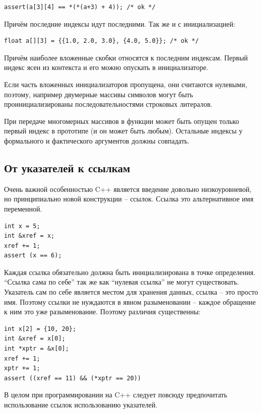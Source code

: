 \documentclass[a4paper,12pt,oneside]{article}
\begin{document}
\begin{lstlisting}
assert(a[3][4] == *(*(a+3) + 4)); /* ok */
\end{lstlisting}

Причём последние индексы идут последними. Так же и с инициализацией:

\begin{lstlisting}
float a[][3] = {{1.0, 2.0, 3.0}, {4.0, 5.0}}; /* ok */
\end{lstlisting}

Причём наиболее вложенные скобки относятся к последним индексам. Первый индекс ясен из контекста и его можно опускать в инициализаторе.

Если часть вложенных инициализаторов пропущена, они считаются нулевыми, поэтому, например двумерные массивы символов могут быть проинициализированы последовательностями строковых литералов.

При передаче многомерных массивов в функции может быть опущен только первый индекс в прототипе (и он может быть любым). Остальные индексы у формального и фактического аргументов должны совпадать.

\subsection{От указателей к ссылкам}

Очень важной особенностью C++ является введение довольно низкоуровневой, но принципиально новой конструкции – ссылок. Ссылка это альтернативное имя переменной.

\begin{lstlisting}
int x = 5;
int &xref = x;
xref += 1;
assert (x == 6);
\end{lstlisting}

Каждая ссылка обязательно должна быть инициализирована в точке определения. ``Ссылка сама по себе'' так же как ``нулевая ссылка'' не могут существовать. Указатель сам по себе является местом для хранения данных, ссылка – это просто имя. Поэтому ссылки не нуждаются в явном разыменовании – каждое обращение к ним это уже разыменование. Поэтому различия существенны:

\begin{lstlisting}
int x[2] = {10, 20};
int &xref = x[0];
int *xptr = &x[0];
xref += 1;
xptr += 1;
assert ((xref == 11) && (*xptr == 20))
\end{lstlisting}

В целом при программировании на C++ следует повсюду предпочитать использование ссылок использованию указателей.
\end{document}
